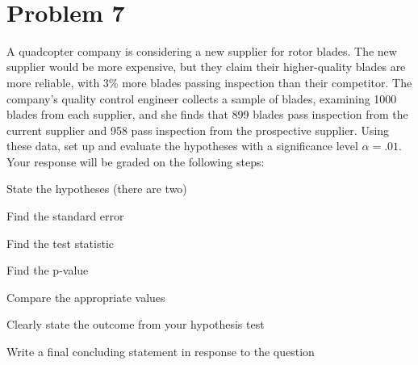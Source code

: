 \documentclass[11pt,twoside]{article}
\newcommand{\pts}[1]{\marginpar{ \small\hspace{0pt} \textit{[#1]} } }
\newcommand{\?}{\stackrel{?}{=}}
\begin{document}
   \eject~
   \eject

\section*{Problem 7       }
A quadcopter company is considering a new supplier for rotor blades. The new supplier would be more expensive, but they claim their higher-quality blades are more reliable,  with 3\% more blades passing inspection than their competitor.
The company's quality control engineer collects a sample of blades, examining 1000 blades from each supplier, and she finds that 899 blades pass inspection from the current supplier and 958 pass inspection from the prospective supplier.
Using these data, set up and evaluate the hypotheses with a significance level $\alpha = .01$.
Your response will be graded on the following steps:
\begin{compactitem}
  \item State the hypotheses (there are two) \pts{2}
  \item Find the standard error \pts{2}
  \item Find the test statistic \pts{2}
  \item Find the p-value \pts{2}
  \item Compare the appropriate values \pts{1}
  \item Clearly state the outcome from your hypothesis test \pts{1}
  \item Write a final concluding statement in response to the question \pts{2}
  \end{compactitem}


\eject  
~
\end{document}
